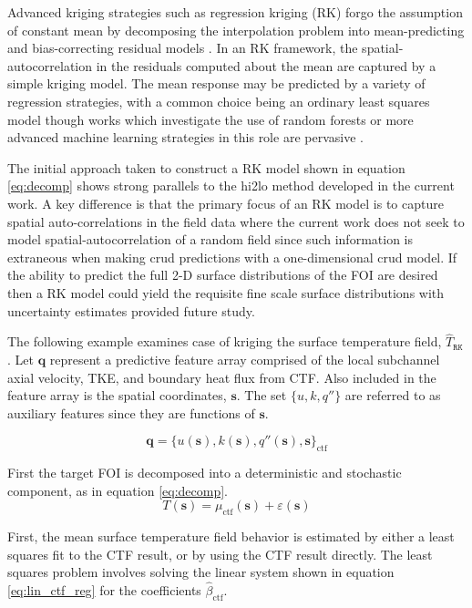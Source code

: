 Advanced kriging strategies such as regression kriging (RK) forgo the assumption of constant mean by decomposing the interpolation problem into mean-predicting and bias-correcting residual models \cite{Hengl07}.  In an RK framework, the spatial-autocorrelation in the residuals computed about the mean are captured by a simple kriging model.  The mean response may be predicted by a variety of regression strategies, with a common choice being an ordinary least squares model though works which investigate the use of random forests or more advanced machine learning strategies in this role are pervasive \cite{LI20111647} \cite{LI2017112}.

The initial approach taken to construct a RK model shown in equation \ref{eq:decomp} shows strong parallels to the hi2lo method developed in the current work.  A key difference is that the primary focus of an RK model is to capture spatial auto-correlations in the field data where the current work does not seek to model spatial-autocorrelation of a random field since such information is extraneous when making crud predictions with a one-dimensional crud model.   If the ability to predict the full 2-D surface distributions of the FOI are desired then a RK model could yield the requisite fine scale surface distributions with uncertainty estimates provided future study.

The following example examines case of kriging the surface temperature field, $\hat T_\mathtt{RK}$.
Let $\mathbf{q}$ represent a predictive feature array comprised of the local subchannel axial velocity,
TKE, and boundary heat flux from CTF.  Also included in the feature array is the spatial coordinates, $\mathbf s$.  The set $\{u, k, q'' \}$ are referred to as auxiliary features since they are functions of $\mathbf s$.

\begin{equation}
\mathbf{q} = \{u(\mathbf s), k(\mathbf s), q''(\mathbf s), \mathbf s \}_{\mathrm{ctf}}
\end{equation}

First the target FOI is decomposed into a deterministic and stochastic component, as in equation \ref{eq:decomp}.
\begin{equation}
T(\mathbf s) = \mu_{\mathrm{ctf}}(\mathbf s) + \varepsilon(\mathbf s)
\label{eq:decomp}
\end{equation}

First, the mean surface temperature field behavior is estimated by either a least squares fit to the CTF result, or by using the CTF result directly.  The least squares problem involves solving the linear system shown in equation \ref{eq:lin_ctf_reg} for the coefficients $\hat{\beta}_{\mathrm{ctf}}$.

